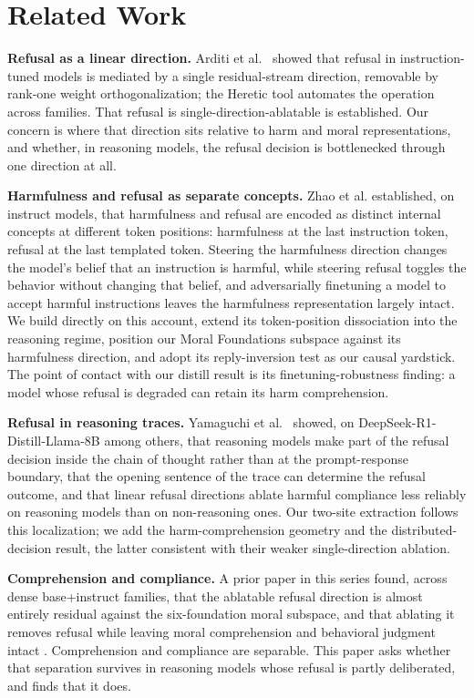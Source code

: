 \section{Related Work}\label{related-work}

\textbf{Refusal as a linear direction.} Arditi et al.~\citep{arditi2024refusal} showed
that refusal in instruction-tuned models is mediated by a single residual-stream
direction, removable by rank-one weight orthogonalization; the Heretic tool
\citep{pew2025heretic} automates the operation across families. That refusal is
single-direction-ablatable is established. Our concern is where that direction sits
relative to harm and moral representations, and whether, in reasoning models, the
refusal decision is bottlenecked through one direction at all.

\textbf{Harmfulness and refusal as separate concepts.} Zhao et al.
\citep{zhao2025harmfulness} established, on instruct models, that harmfulness and
refusal are encoded as distinct internal concepts at different token positions:
harmfulness at the last instruction token, refusal at the last templated token.
Steering the harmfulness direction changes the model's belief that an instruction is
harmful, while steering refusal toggles the behavior without changing that belief,
and adversarially finetuning a model to accept harmful instructions leaves the
harmfulness representation largely intact. We build directly on this account,
extend its token-position dissociation into the reasoning regime, position our Moral
Foundations subspace against its harmfulness direction, and adopt its
reply-inversion test as our causal yardstick. The point of contact with our distill
result is its finetuning-robustness finding: a model whose refusal is degraded can
retain its harm comprehension.

\textbf{Refusal in reasoning traces.} Yamaguchi et al.~\citep{yamaguchi2025reasoning}
showed, on DeepSeek-R1-Distill-Llama-8B among others, that reasoning models make
part of the refusal decision inside the chain of thought rather than at the
prompt-response boundary, that the opening sentence of the trace can determine the
refusal outcome, and that linear refusal directions ablate harmful compliance less
reliably on reasoning models than on non-reasoning ones. Our two-site extraction
follows this localization; we add the harm-comprehension geometry and the
distributed-decision result, the latter consistent with their weaker
single-direction ablation.

\textbf{Comprehension and compliance.} A prior paper in this series found, across dense
base+instruct families, that the ablatable refusal direction is almost entirely
residual against the six-foundation moral subspace, and that ablating it removes
refusal while leaving moral comprehension and behavioral judgment intact
\citep{reblitzrichardson2026crossmodel}. Comprehension and compliance are separable.
This paper asks whether that separation survives in reasoning models whose refusal
is partly deliberated, and finds that it does.

